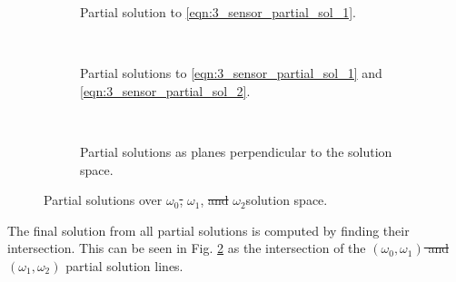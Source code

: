 \documentclass[letterpaper, 10 pt, conference]{ieeeconf}  %
\providecommand{\DIFadd}[1]{{\protect\color{blue}\uwave{#1}}} %
\providecommand{\DIFdel}[1]{{\protect\color{red}\sout{#1}}}                      %
\providecommand{\DIFaddbegin}{} %
\providecommand{\DIFaddend}{} %
\providecommand{\DIFdelbegin}{} %
\providecommand{\DIFdelend}{} %
\providecommand{\DIFaddFL}[1]{\DIFadd{#1}} %
\providecommand{\DIFdelFL}[1]{\DIFdel{#1}} %
\providecommand{\DIFaddbeginFL}{} %
\providecommand{\DIFaddendFL}{} %
\providecommand{\DIFdelbeginFL}{} %
\providecommand{\DIFdelendFL}{} %
\begin{document}
\begin{figure*}[tb]
   \begin{subfigure}[t]{0.3\textwidth}
      \begin{center}
         
      \end{center}
      \caption{Partial solution to \eqref{eqn:3_sensor_partial_sol_1}.}
      \label{fig:3_sensor_partial_sol}
   \end{subfigure}
   ~
   \begin{subfigure}[t]{0.3\textwidth}
      \begin{center}
         
      \end{center}
      \caption{Partial solutions to \eqref{eqn:3_sensor_partial_sol_1} and \eqref{eqn:3_sensor_partial_sol_2}.}
      \label{fig:3_sensor_partial_sols}
   \end{subfigure}
   ~
   \begin{subfigure}[t]{0.3\textwidth}
      \begin{center}
         
      \end{center}
      \caption{Partial solutions as planes perpendicular to the solution space.}
      \label{fig:3sen_planes}
   \end{subfigure}
   \caption{Partial solutions over \DIFdelbeginFL \DIFdelFL{$\omega_0$, }\DIFdelendFL $\omega_1$, \DIFdelbeginFL \DIFdelFL{and }\DIFdelendFL $\omega_2$\DIFaddbeginFL \DIFaddFL{, and $\omega_3$ }\DIFaddendFL solution space.}
   \vspace{-\baselineskip}
   \label{fig:partial_sols_and_planes}
\end{figure*}
The final solution from all partial solutions is computed by finding their intersection. This can be seen in Fig. \ref{fig:3_sensor_partial_sols} as the intersection of the \DIFdelbegin \DIFdel{$(\omega_0,\omega_1)$ and }\DIFdelend $(\omega_1,\omega_2)$ \DIFaddbegin \DIFadd{and $(\omega_2,\omega_3)$ }\DIFaddend partial solution lines.
\end{document}
